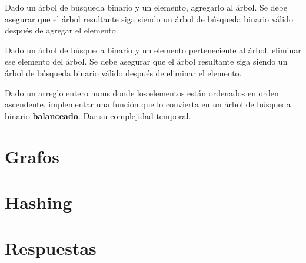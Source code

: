 \documentclass[titlepage,oneside]{book}
\begin{document}
\begin{Exercise}
   Dado un árbol de búsqueda binario y un elemento, agregarlo al árbol. Se debe asegurar que el árbol resultante siga siendo un árbol de búsqueda binario válido después de agregar el elemento.
\end{Exercise}

\begin{Exercise}
   Dado un árbol de búsqueda binario y un elemento perteneciente al árbol, eliminar ese elemento del árbol. Se debe asegurar que el árbol resultante siga siendo un árbol de búsqueda binario válido después de eliminar el elemento.
\end{Exercise}

\begin{Exercise}
   Dado un arreglo entero nums donde los elementos están ordenados en orden ascendente, implementar una función que lo convierta en un árbol de búsqueda binario \textbf{balanceado}. Dar su complejidad temporal.
\end{Exercise}



\chapter{Grafos}

\chapter{Hashing}

\chapter{Respuestas}
\shipoutAnswer

\printbibliography{}
\end{document}
